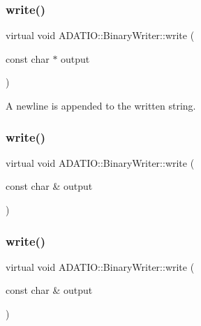 \subsubsection{\texorpdfstring{write()}{write()}\hspace{0.1cm}{\footnotesize\ttfamily [6/36]}}
{\footnotesize\ttfamily virtual void A\+D\+A\+T\+I\+O\+::\+Binary\+Writer\+::write (\begin{DoxyParamCaption}\item[{const char $\ast$}]{output }\end{DoxyParamCaption})\hspace{0.3cm}{\ttfamily [virtual]}}

A newline is appended to the written string. \mbox{\label{classADATIO_1_1BinaryWriter_a910cfae9646644ba79a79b5686099fa9}} 
\subsubsection{\texorpdfstring{write()}{write()}\hspace{0.1cm}{\footnotesize\ttfamily [7/36]}}
{\footnotesize\ttfamily virtual void A\+D\+A\+T\+I\+O\+::\+Binary\+Writer\+::write (\begin{DoxyParamCaption}\item[{const char \&}]{output }\end{DoxyParamCaption})\hspace{0.3cm}{\ttfamily [virtual]}}

\mbox{\label{classADATIO_1_1BinaryWriter_a910cfae9646644ba79a79b5686099fa9}} 
\subsubsection{\texorpdfstring{write()}{write()}\hspace{0.1cm}{\footnotesize\ttfamily [8/36]}}
{\footnotesize\ttfamily virtual void A\+D\+A\+T\+I\+O\+::\+Binary\+Writer\+::write (\begin{DoxyParamCaption}\item[{const char \&}]{output }\end{DoxyParamCaption})\hspace{0.3cm}{\ttfamily [virtual]}}

